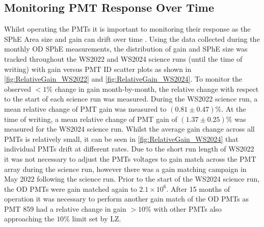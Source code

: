 \subsection{Monitoring PMT Response Over Time}
Whilst operating the PMTs it is important to monitoring their response as the SPhE Area size and gain can drift over time \cite{DayaBay:2016ggj,Super-Kamiokande:2023jbt}. Using the data collected during the monthly OD SPhE measurements, the distribution of gain and SPhE size was tracked throughout the WS2022 and WS2024 science runs (until the time of writing) with gain versus PMT ID scatter plots as shown in \autoref{fig:RelativeGain_WS2022} and \autoref{fig:RelativeGain_WS2024}.
To monitor the observed $<1\%$ change in gain month-by-month, the relative change with respect to the start of each science run was measured. During the WS2022 science run, a mean relative change of PMT gain was measured to $(0.81\pm0.47)\%$. At the time of writing, a mean relative change of PMT gain of $(1.37\pm0.25)\%$ was measured for the WS2024 science run. Whilst the average gain change across all PMTs is relatively small, it can be seen in \autoref{fig:RelativeGain_WS2024} that individual PMTs drift at different rates. Due to the short run length of WS2022 it was not necessary to adjust the PMTs voltages to gain match across the PMT array during the science run, however there was a gain matching campaign in May 2022 following the science run. Prior to the start of the WS2024 science run, the OD PMTs were gain matched again to $2.1\times10^{6}$. After 15 months of operation it was necessary to perform another gain match of the OD PMTs as PMT 859 had a relative change in gain $>10\%$ with other PMTs also approaching the $10\%$ limit set by LZ.

